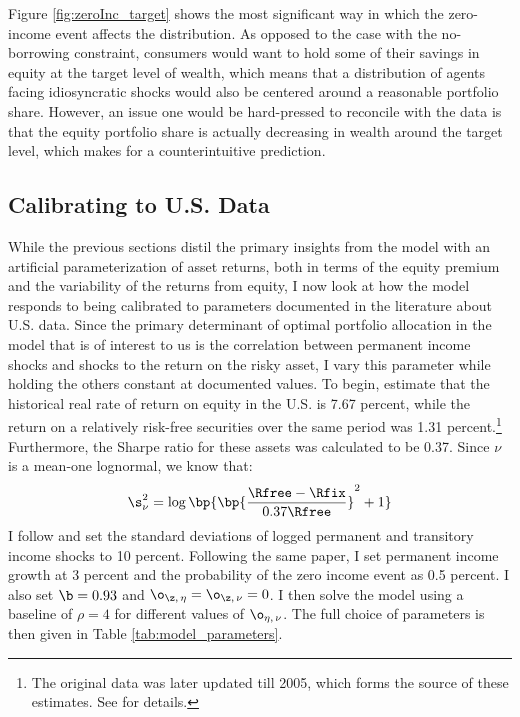 Figure \ref{fig:zeroInc_target} shows the most significant way in which the zero-income event affects the distribution. As opposed to the case with the no-borrowing constraint, consumers would want to hold some of their savings in equity at the target level of wealth, which means that a distribution of agents facing idiosyncratic shocks would also be centered around a reasonable portfolio share. However, an issue one would be hard-pressed to reconcile with the data is that the equity portfolio share is actually decreasing in wealth around the target level, which makes for a counterintuitive prediction.

\subsection{Calibrating to U.S. Data}\label{us_data}

While the previous sections distil the primary insights from the model with an artificial parameterization of asset returns, both in terms of the equity premium and the variability of the returns from equity, I now look at how the model responds to being calibrated to parameters documented in the literature about U.S. data. Since the primary determinant of optimal portfolio allocation in the model that is of interest to us is the correlation between permanent income shocks and shocks to the return on the risky asset, I vary this parameter while holding the others constant at documented values. To begin, \citet{Mehra1985} estimate that the historical real rate of return on equity in the U.S. is 7.67 percent, while the return on a relatively risk-free securities over the same period was 1.31 percent.\footnote{The original data was later updated till 2005, which forms the source of these estimates. See \citet{Mehra2006} for details.} Furthermore, the Sharpe ratio for these assets was calculated to be 0.37. Since $\nu$ is a mean-one lognormal, we know that:
\[
\s_{\nu}^2 = \log\bp{\bp{\frac{\Rfree - \Rfix}{0.37\Rfree}}^2 + 1}
\]
I follow \citet{Carroll1992} and set the standard deviations of logged permanent and transitory income shocks to 10 percent. Following the same paper, I set permanent income growth at 3 percent and the probability of the zero income event as 0.5 percent. I also set $\b = 0.93$ and $\o_{\z,\,\eta} = \o_{\z,\,\nu} = 0$. I then solve the model using a baseline of $\rho = 4$ for different values of $\o_{\eta,\,\nu}$. The full choice of parameters is then given in Table \ref{tab:model_parameters}.

